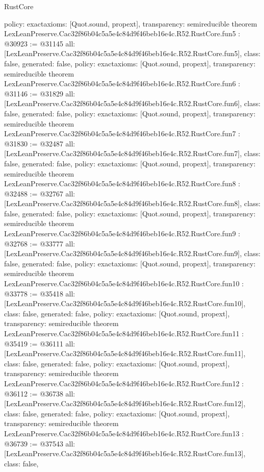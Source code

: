 \begin{lexlean}{RustCore}
\begin{coremodule}
{  policy: exact{axioms: [Quot.sound, propext]},
  transparency: semireducible
}
theorem LexLeanPreserve.Cac32f86b04c5a5e4c84d9f46beb16e4c.R52.RustCore.fun5 : @30923 := @31145 {
  all: [LexLeanPreserve.Cac32f86b04c5a5e4c84d9f46beb16e4c.R52.RustCore.fun5],
  class: false,
  generated: false,
  policy: exact{axioms: [Quot.sound, propext]},
  transparency: semireducible
}
theorem LexLeanPreserve.Cac32f86b04c5a5e4c84d9f46beb16e4c.R52.RustCore.fun6 : @31146 := @31829 {
  all: [LexLeanPreserve.Cac32f86b04c5a5e4c84d9f46beb16e4c.R52.RustCore.fun6],
  class: false,
  generated: false,
  policy: exact{axioms: [Quot.sound, propext]},
  transparency: semireducible
}
theorem LexLeanPreserve.Cac32f86b04c5a5e4c84d9f46beb16e4c.R52.RustCore.fun7 : @31830 := @32487 {
  all: [LexLeanPreserve.Cac32f86b04c5a5e4c84d9f46beb16e4c.R52.RustCore.fun7],
  class: false,
  generated: false,
  policy: exact{axioms: [Quot.sound, propext]},
  transparency: semireducible
}
theorem LexLeanPreserve.Cac32f86b04c5a5e4c84d9f46beb16e4c.R52.RustCore.fun8 : @32488 := @32767 {
  all: [LexLeanPreserve.Cac32f86b04c5a5e4c84d9f46beb16e4c.R52.RustCore.fun8],
  class: false,
  generated: false,
  policy: exact{axioms: [Quot.sound, propext]},
  transparency: semireducible
}
theorem LexLeanPreserve.Cac32f86b04c5a5e4c84d9f46beb16e4c.R52.RustCore.fun9 : @32768 := @33777 {
  all: [LexLeanPreserve.Cac32f86b04c5a5e4c84d9f46beb16e4c.R52.RustCore.fun9],
  class: false,
  generated: false,
  policy: exact{axioms: [Quot.sound, propext]},
  transparency: semireducible
}
theorem LexLeanPreserve.Cac32f86b04c5a5e4c84d9f46beb16e4c.R52.RustCore.fun10 : @33778 := @35418 {
  all: [LexLeanPreserve.Cac32f86b04c5a5e4c84d9f46beb16e4c.R52.RustCore.fun10],
  class: false,
  generated: false,
  policy: exact{axioms: [Quot.sound, propext]},
  transparency: semireducible
}
theorem LexLeanPreserve.Cac32f86b04c5a5e4c84d9f46beb16e4c.R52.RustCore.fun11 : @35419 := @36111 {
  all: [LexLeanPreserve.Cac32f86b04c5a5e4c84d9f46beb16e4c.R52.RustCore.fun11],
  class: false,
  generated: false,
  policy: exact{axioms: [Quot.sound, propext]},
  transparency: semireducible
}
theorem LexLeanPreserve.Cac32f86b04c5a5e4c84d9f46beb16e4c.R52.RustCore.fun12 : @36112 := @36738 {
  all: [LexLeanPreserve.Cac32f86b04c5a5e4c84d9f46beb16e4c.R52.RustCore.fun12],
  class: false,
  generated: false,
  policy: exact{axioms: [Quot.sound, propext]},
  transparency: semireducible
}
theorem LexLeanPreserve.Cac32f86b04c5a5e4c84d9f46beb16e4c.R52.RustCore.fun13 : @36739 := @37543 {
  all: [LexLeanPreserve.Cac32f86b04c5a5e4c84d9f46beb16e4c.R52.RustCore.fun13],
  class: false,
}
\end{coremodule}
\end{lexlean}
